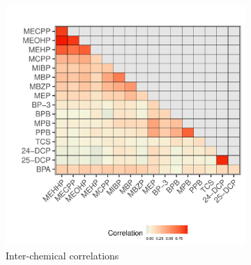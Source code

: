 \clearpage
\begin{landscape}
\begin{figure}
\centering
\begin{subfigure}[b]{0.7\textwidth}
\includegraphics[scale = 0.69]{./figures/ppp_corr.pdf}
\caption{Inter-chemical correlations}
\label{fig:corr}
\end{subfigure}
\hspace{5em}
\begin{subfigure}[b]{0.3\textwidth}

\end{subfigure}
\end{figure}
\end{landscape}
